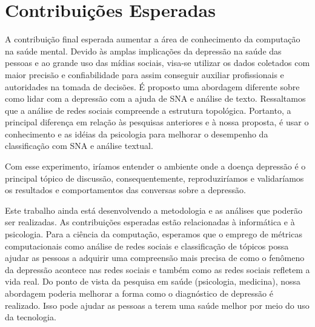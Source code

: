 \documentclass[11pt, notitlepage]{article} %
\begin{document}
\section*{Contribuições Esperadas}
A contribuição final esperada aumentar a área de conhecimento da computação na saúde mental. Devido às amplas implicações da depressão na saúde das pessoas e ao grande uso das mídias sociais, visa-se utilizar os dados coletados com maior precisão e confiabilidade para assim conseguir auxiliar profissionais e autoridades na tomada de decisões.
É proposto uma abordagem diferente sobre como lidar com a depressão com a ajuda de SNA e análise de texto.
Ressaltamos que a análise de redes sociais compreende a estrutura topológica. Portanto, a principal diferença em relação às pesquisas anteriores e à nossa proposta, é usar o conhecimento e as idéias da psicologia para melhorar o desempenho da classificação com SNA e análise textual.

Com esse experimento, iríamos entender o ambiente onde a doença depressão é o principal tópico de discussão, consequentemente, reproduziríamos e validaríamos os resultados e comportamentos das conversas sobre a depressão. %

Este trabalho ainda está desenvolvendo a metodologia e as análises que poderão ser realizadas. As contribuições esperadas estão relacionadas à informática e à psicologia. Para a ciência da computação, esperamos que o emprego de métricas computacionais como análise de redes sociais e classificação de tópicos possa ajudar as pessoas a adquirir uma compreensão mais precisa de como o fenômeno da depressão acontece nas redes sociais e também como as redes sociais refletem a vida real.
Do ponto de vista da pesquisa em saúde (psicologia, medicina), nossa abordagem poderia melhorar a forma como o diagnóstico de depressão é realizado. Isso pode ajudar as pessoas a terem uma saúde melhor por meio do uso da tecnologia.

\end{document}
